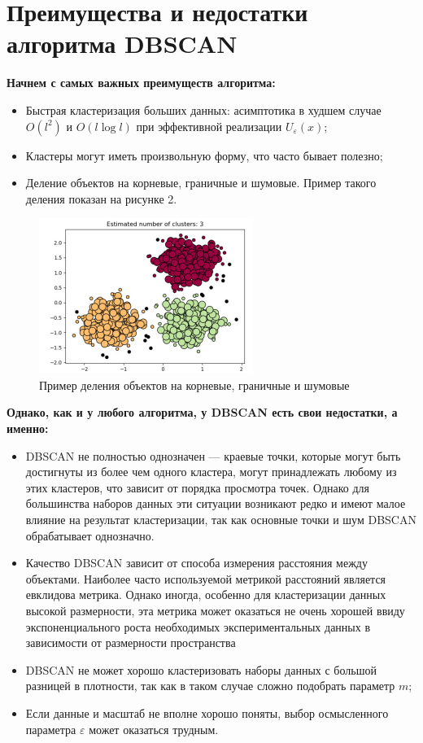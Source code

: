 \section*{Преимущества и недостатки алгоритма DBSCAN}
\textbf{Начнем с самых важных преимуществ алгоритма:}
\begin{itemize}
    \item Быстрая кластеризация больших данных: асимптотика в худшем случае $O(l^2)$ и $O(l \log l)$ при эффективной реализации $U_{\varepsilon}(x)$;
    \item Кластеры могут иметь произвольную форму, что часто бывает полезно;
    \item Деление объектов на корневые, граничные и шумовые. Пример такого деления показан на рисунке 2.
\end{itemize}
\begin{figure}[h]
    \centering
    \includegraphics[width=0.47\linewidth]{chapters/unlabeled/clusters.png}
    \caption{Пример деления объектов на корневые, граничные и шумовые}
    \label{fig:enter-label}
\end{figure}
\textbf{Однако, как и у любого алгоритма, у DBSCAN есть свои недостатки, а именно:}
\begin{itemize}
    \item DBSCAN не полностью однозначен — краевые точки, которые могут быть достигнуты из более чем одного кластера, могут принадлежать любому из этих кластеров, что зависит от порядка просмотра точек. Однако для большинства наборов данных эти ситуации возникают редко и имеют малое влияние на результат кластеризации, так как основные точки и шум DBSCAN обрабатывает однозначно.
    \item Качество DBSCAN зависит от способа измерения расстояния между объектами. Наиболее часто используемой метрикой расстояний является евклидова метрика. Однако иногда, особенно для кластеризации данных высокой размерности, эта метрика может оказаться не очень хорошей ввиду экспоненциального роста необходимых экспериментальных данных в зависимости от размерности пространства
    \item DBSCAN не может хорошо кластеризовать наборы данных с большой разницей в плотности, так как в таком случае сложно подобрать параметр $m$;
    \item Если данные и масштаб не вполне хорошо поняты, выбор осмысленного параметра $\varepsilon$ может оказаться трудным.
\end{itemize}
